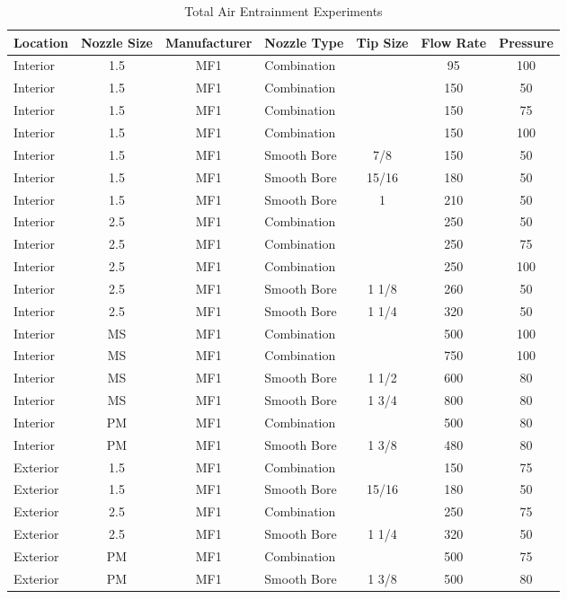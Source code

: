\documentclass{article}
\begin{document}
\begin{table}[!ht]
\centering
\begin{tabular}{|lcclccc|}
\hline
\multicolumn{1}{|c|}{\textbf{Location}} & \multicolumn{1}{c|}{\textbf{Nozzle Size}} & \multicolumn{1}{c|}{\textbf{Manufacturer}} & \multicolumn{1}{c|}{\textbf{Nozzle Type}} & \multicolumn{1}{c|}{\textbf{Tip Size}} & \multicolumn{1}{c|}{\textbf{Flow Rate}} & \textbf{Pressure} \\ \hline
Interior & 1.5 & MF1 & Combination &  & 95 & 100 \\
Interior & 1.5 & MF1 & Combination &  & 150 & 50 \\
Interior & 1.5 & MF1 & Combination &  & 150 & 75 \\
Interior & 1.5 & MF1 & Combination &  & 150 & 100 \\
Interior & 1.5 & MF1 & Smooth Bore & 7/8 & 150 & 50 \\
Interior & 1.5 & MF1 & Smooth Bore & 15/16 & 180 & 50 \\
Interior & 1.5 & MF1 & Smooth Bore & 1 & 210 & 50 \\
Interior & 2.5 & MF1 & Combination &  & 250 & 50 \\
Interior & 2.5 & MF1 & Combination &  & 250 & 75 \\
Interior & 2.5 & MF1 & Combination &  & 250 & 100 \\
Interior & 2.5 & MF1 & Smooth Bore & 1 1/8 & 260 & 50 \\
Interior & 2.5 & MF1 & Smooth Bore & 1 1/4 & 320 & 50 \\
Interior & MS & MF1 & Combination &  & 500 & 100 \\
Interior & MS & MF1 & Combination &  & 750 & 100 \\
Interior & MS & MF1 & Smooth Bore & 1 1/2 & 600 & 80 \\
Interior & MS & MF1 & Smooth Bore & 1 3/4 & 800 & 80 \\
Interior & PM & MF1 & Combination &  & 500 & 80 \\
Interior & PM & MF1 & Smooth Bore & 1 3/8 & 480 & 80 \\
Exterior & 1.5 & MF1 & Combination &  & 150 & 75 \\
Exterior & 1.5 & MF1 & Smooth Bore & 15/16 & 180 & 50 \\
Exterior & 2.5 & MF1 & Combination &  & 250 & 75 \\
Exterior & 2.5 & MF1 & Smooth Bore & 1 1/4 & 320 & 50 \\
Exterior & PM & MF1 & Combination &  & 500 & 75 \\
Exterior & PM & MF1 & Smooth Bore & 1 3/8 & 500 & 80 \\ \hline
\end{tabular}
\caption{Total Air Entrainment Experiments}
\label{Total_Air_Entrainment_Experiments}
\end{table}
\end{document}
